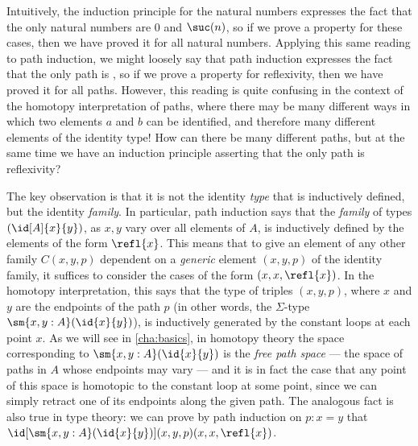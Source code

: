 \begin{rmk}\label{rmk:the-only-path-is-refl}
Intuitively, the induction principle for the natural numbers expresses the fact that the only natural numbers are $0$ and $\suc(n)$, so if we prove a property for these cases, then we have proved it for all natural numbers.  Applying this same reading to path induction, we might loosely say that path induction expresses the fact that the only path is , so if we prove a property for reflexivity, then we have proved it for all paths.  However, this reading is quite confusing in the context of the homotopy interpretation of paths, where there may be many different ways in which two elements $a$ and $b$ can be identified, and therefore many different elements of the identity type!  How can there be many different paths, but at the same time we have an induction principle asserting that the only path is reflexivity?

The key observation is that it is not the identity \emph{type} that is inductively defined, but the identity \emph{family}.
In particular, path induction says that the \emph{family} of types $(\id[A]{x}{y})$, as $x,y$ vary over all elements of $A$, is inductively defined by the elements of the form $\refl{x}$.
This means that to give an element of any other family $C(x,y,p)$ dependent on a \emph{generic} element $(x,y,p)$ of the identity family, it suffices to consider the cases of the form $(x,x,\refl{x})$.
In the homotopy interpretation, this says that the type of triples $(x,y,p)$, where $x$ and $y$ are the endpoints of the path $p$ (in other words, the $\Sigma$-type $\sm{x,y:A}(\id{x}{y})$), is inductively generated by the constant loops at each point $x$.
As we will see in \cref{cha:basics}, in homotopy theory the space corresponding to $\sm{x,y:A}(\id{x}{y})$ is the \emph{free path space} --- the space of paths in $A$ whose endpoints may vary --- and it is in fact the case that any point of this space is homotopic to the constant loop at some point, since we can simply retract one of its endpoints along the given path.
The analogous fact is also true in type theory: we can prove by path induction on $p:x=y$ that $\id[\sm{x,y:A}(\id{x}{y})]{(x,y,p)}{(x,x,\refl{x})}$.


\end{rmk}
